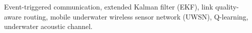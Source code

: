 \begin{IEEEkeywords}
Event-triggered communication, extended Kalman filter (EKF), link
quality-aware routing, mobile underwater wireless sensor network (UWSN),
Q-learning, underwater acoustic channel.
\end{IEEEkeywords}
